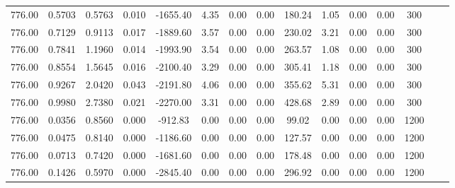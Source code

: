 \documentclass[%
 aip,
 jcp,
 sd,%
 amsmath,amssymb,
]{revtex4-1}
\begin{document}
\begin{table*}[!htbp]
\begin{ruledtabular}
\begin{tabular}{ccccccccccccccc}
776.00	&	0.5703	&	0.5763	&	0.010	&	-1655.40	&	4.35	&	0.00	&	0.00	&	180.24	&	1.05	&	0.00	&	0.00	&	300	\\
776.00	&	0.7129	&	0.9113	&	0.017	&	-1889.60	&	3.57	&	0.00	&	0.00	&	230.02	&	3.21	&	0.00	&	0.00	&	300	\\
776.00	&	0.7841	&	1.1960	&	0.014	&	-1993.90	&	3.54	&	0.00	&	0.00	&	263.57	&	1.08	&	0.00	&	0.00	&	300	\\
776.00	&	0.8554	&	1.5645	&	0.016	&	-2100.40	&	3.29	&	0.00	&	0.00	&	305.41	&	1.18	&	0.00	&	0.00	&	300	\\
776.00	&	0.9267	&	2.0420	&	0.043	&	-2191.80	&	4.06	&	0.00	&	0.00	&	355.62	&	5.31	&	0.00	&	0.00	&	300	\\
776.00	&	0.9980	&	2.7380	&	0.021	&	-2270.00	&	3.31	&	0.00	&	0.00	&	428.68	&	2.89	&	0.00	&	0.00	&	300	\\
776.00	&	0.0356	&	0.8560	&	0.000	&	-912.83	&	0.00	&	0.00	&	0.00	&	99.02	&	0.00	&	0.00	&	0.00	&	1200	\\
776.00	&	0.0475	&	0.8140	&	0.000	&	-1186.60	&	0.00	&	0.00	&	0.00	&	127.57	&	0.00	&	0.00	&	0.00	&	1200	\\
776.00	&	0.0713	&	0.7420	&	0.000	&	-1681.60	&	0.00	&	0.00	&	0.00	&	178.48	&	0.00	&	0.00	&	0.00	&	1200	\\
776.00	&	0.1426	&	0.5970	&	0.000	&	-2845.40	&	0.00	&	0.00	&	0.00	&	296.92	&	0.00	&	0.00	&	0.00	&	1200	\\
\end{tabular}
\end{ruledtabular}
\end{table*}
\end{document}
